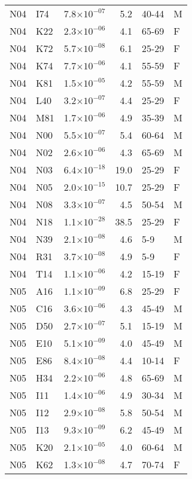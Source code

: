 \begin{longtable}{lllrll}
   N04 & I74 & 7.8$\times10^{-07}$ & 5.2 & 40-44 & M \\ 
   N04 & K22 & 2.3$\times10^{-06}$ & 4.1 & 65-69 & F \\ 
   N04 & K72 & 5.7$\times10^{-08}$ & 6.1 & 25-29 & F \\ 
   N04 & K74 & 7.7$\times10^{-06}$ & 4.1 & 55-59 & F \\ 
   N04 & K81 & 1.5$\times10^{-05}$ & 4.2 & 55-59 & M \\ 
   N04 & L40 & 3.2$\times10^{-07}$ & 4.4 & 25-29 & F \\ 
   N04 & M81 & 1.7$\times10^{-06}$ & 4.9 & 35-39 & M \\ 
   N04 & N00 & 5.5$\times10^{-07}$ & 5.4 & 60-64 & M \\ 
   N04 & N02 & 2.6$\times10^{-06}$ & 4.3 & 65-69 & M \\ 
   N04 & N03 & 6.4$\times10^{-18}$ & 19.0 & 25-29 & F \\ 
   N04 & N05 & 2.0$\times10^{-15}$ & 10.7 & 25-29 & F \\ 
   N04 & N08 & 3.3$\times10^{-07}$ & 4.5 & 50-54 & M \\ 
   N04 & N18 & 1.1$\times10^{-28}$ & 38.5 & 25-29 & F \\ 
   N04 & N39 & 2.1$\times10^{-08}$ & 4.6 & 5-9 & M \\ 
   N04 & R31 & 3.7$\times10^{-08}$ & 4.9 & 5-9 & F \\ 
   N04 & T14 & 1.1$\times10^{-06}$ & 4.2 & 15-19 & F \\ 
   N05 & A16 & 1.1$\times10^{-09}$ & 6.8 & 25-29 & F \\ 
   N05 & C16 & 3.6$\times10^{-06}$ & 4.3 & 45-49 & M \\ 
   N05 & D50 & 2.7$\times10^{-07}$ & 5.1 & 15-19 & M \\ 
   N05 & E10 & 5.1$\times10^{-09}$ & 4.0 & 45-49 & M \\ 
   N05 & E86 & 8.4$\times10^{-08}$ & 4.4 & 10-14 & F \\ 
   N05 & H34 & 2.2$\times10^{-06}$ & 4.8 & 65-69 & M \\ 
   N05 & I11 & 1.4$\times10^{-06}$ & 4.9 & 30-34 & M \\ 
   N05 & I12 & 2.9$\times10^{-08}$ & 5.8 & 50-54 & M \\ 
   N05 & I13 & 9.3$\times10^{-09}$ & 6.2 & 45-49 & M \\ 
   N05 & K20 & 2.1$\times10^{-05}$ & 4.0 & 60-64 & M \\ 
   N05 & K62 & 1.3$\times10^{-08}$ & 4.7 & 70-74 & F \\ 

\end{longtable}
